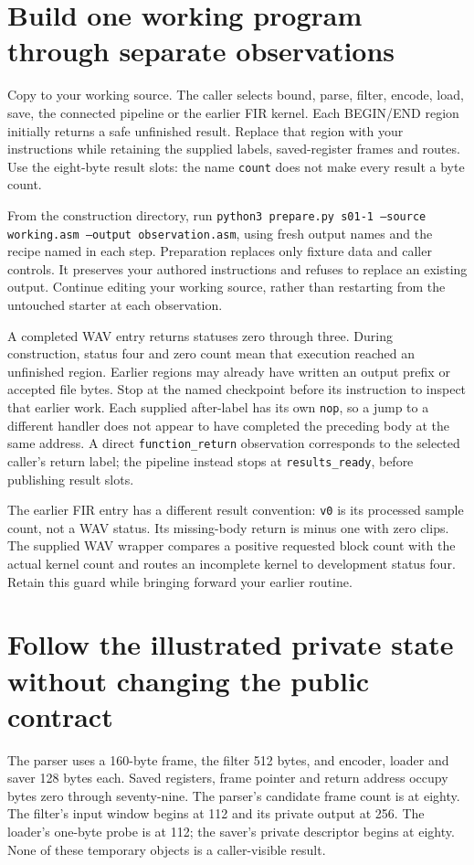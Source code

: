 \section{Build one working program through separate observations}
Copy  to your working source. The caller
selects bound, parse, filter, encode, load, save, the connected pipeline or the earlier
FIR kernel. Each BEGIN/END region initially returns a safe unfinished result. Replace
that region with your instructions while retaining the supplied labels, saved-register
frames and routes. Use the eight-byte result slots: the name \texttt{count} does not
make every result a byte count.

From the construction directory, run \texttt{python3 prepare.py s01-1 --source working.asm --output observation.asm},
using fresh output names and the recipe named in each step. Preparation replaces only
fixture data and caller controls. It preserves your authored instructions and refuses
to replace an existing output. Continue editing your working source, rather than
restarting from the untouched starter at each observation.

A completed WAV entry returns statuses zero through three. During construction,
status four and zero count mean that execution reached an unfinished region. Earlier
regions may already have written an output prefix or accepted file bytes. Stop at the
named checkpoint before its instruction to inspect that earlier work. Each supplied
after-label has its own \texttt{nop}, so a jump to a different handler does not appear
to have completed the preceding body at the same address. A direct
\texttt{function\_return} observation corresponds to the selected caller's return label;
the pipeline instead stops at \texttt{results\_ready}, before publishing result slots.

The earlier FIR entry has a different result convention: \texttt{v0} is its processed
sample count, not a WAV status. Its missing-body return is minus one with zero clips.
The supplied WAV wrapper compares a positive requested block count with the actual
kernel count and routes an incomplete kernel to development status four. Retain this
guard while bringing forward your earlier routine.

\section{Follow the illustrated private state without changing the public contract}
The parser uses a 160-byte frame, the filter 512 bytes, and encoder, loader and saver
128 bytes each. Saved registers, frame pointer and return address occupy bytes zero
through seventy-nine. The parser's candidate frame count is at eighty. The filter's
input window begins at 112 and its private output at 256. The loader's one-byte probe
is at 112; the saver's private descriptor begins at eighty. None of these temporary
objects is a caller-visible result.


